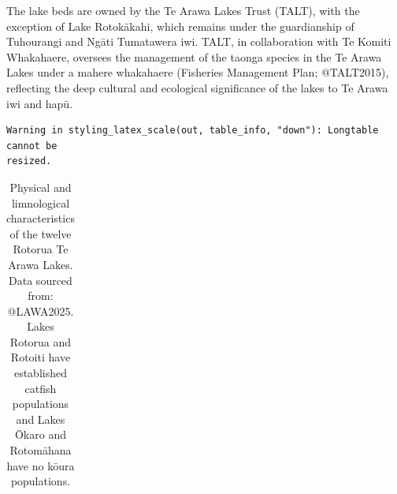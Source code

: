 \documentclass[
  letterpaper,
  DIV=11,
  numbers=noendperiod]{scrartcl}
\begin{document}
The lake beds are owned by the Te Arawa Lakes Trust (TALT), with the
exception of Lake Rotokākahi, which remains under the guardianship of
Tuhourangi and Ngāti Tumatawera iwi. TALT, in collaboration with Te
Komiti Whakahaere, oversees the management of the taonga species in the
Te Arawa Lakes under a mahere whakahaere (Fisheries Management Plan;
@TALT2015), reflecting the deep cultural and ecological significance of
the lakes to Te Arawa iwi and hapū.

\begin{verbatim}
Warning in styling_latex_scale(out, table_info, "down"): Longtable cannot be
resized.
\end{verbatim}

\begingroup\fontsize{8}{10}\selectfont

\begin{longtable}[t]{lrrrrrrrll}

\caption{\label{tbl-bop-lake-overview}Physical and limnological
characteristics of the twelve Rotorua Te Arawa Lakes. Data sourced from:
@LAWA2025. Lakes Rotorua and Rotoiti have established catfish
populations and Lakes Ōkaro and Rotomāhana have no kōura populations.}

\tabularnewline


\end{longtable}
\end{document}
